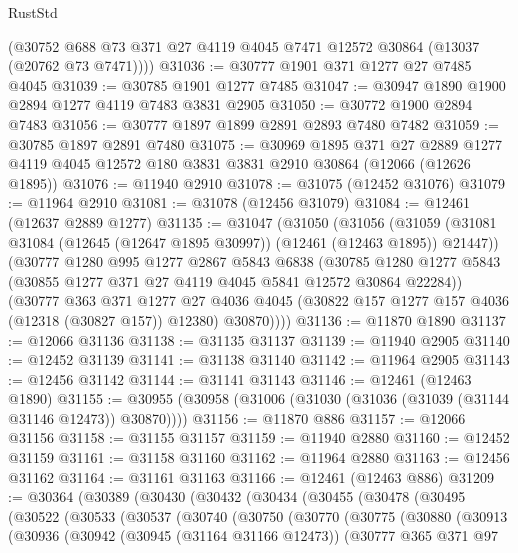 \begin{lexlean}{RustStd}
\begin{coremodule}
      (@30752 @688 @73 @371 @27 @4119 @4045 @7471 @12572 @30864 (@13037 (@20762 @73 @7471))))
@31036 := @30777 @1901 @371 @1277 @27 @7485 @4045
@31039 := @30785 @1901 @1277 @7485
@31047 := @30947 @1890 @1900 @2894 @1277 @4119 @7483 @3831 @2905
@31050 := @30772 @1900 @2894 @7483
@31056 := @30777 @1897 @1899 @2891 @2893 @7480 @7482
@31059 := @30785 @1897 @2891 @7480
@31075 := @30969
    @1895
    @371
    @27
    @2889
    @1277
    @4119
    @4045
    @12572
    @180
    @3831
    @3831
    @2910
    @30864
    (@12066 (@12626 @1895))
@31076 := @11940 @2910
@31078 := @31075 (@12452 @31076)
@31079 := @11964 @2910
@31081 := @31078 (@12456 @31079)
@31084 := @12461 (@12637 @2889 @1277)
@31135 := @31047
    (@31050
      (@31056
        (@31059 (@31081 @31084 (@12645 (@12647 @1895 @30997)) (@12461 (@12463 @1895)) @21447))
        (@30777
          @1280
          @995
          @1277
          @2867
          @5843
          @6838
          (@30785 @1280 @1277 @5843 (@30855 @1277 @371 @27 @4119 @4045 @5841 @12572 @30864 @22284))
          (@30777
            @363
            @371
            @1277
            @27
            @4036
            @4045
            (@30822 @157 @1277 @157 @4036 (@12318 (@30827 @157)) @12380)
            @30870))))
@31136 := @11870 @1890
@31137 := @12066 @31136
@31138 := @31135 @31137
@31139 := @11940 @2905
@31140 := @12452 @31139
@31141 := @31138 @31140
@31142 := @11964 @2905
@31143 := @12456 @31142
@31144 := @31141 @31143
@31146 := @12461 (@12463 @1890)
@31155 := @30955 (@30958 (@31006 (@31030 (@31036 (@31039 (@31144 @31146 @12473)) @30870))))
@31156 := @11870 @886
@31157 := @12066 @31156
@31158 := @31155 @31157
@31159 := @11940 @2880
@31160 := @12452 @31159
@31161 := @31158 @31160
@31162 := @11964 @2880
@31163 := @12456 @31162
@31164 := @31161 @31163
@31166 := @12461 (@12463 @886)
@31209 := @30364
    (@30389
      (@30430
        (@30432
          (@30434
            (@30455
              (@30478
                (@30495
                  (@30522
                    (@30533
                      (@30537
                        (@30740
                          (@30750
                            (@30770
                              (@30775
                                (@30880
                                  (@30913
                                    (@30936
                                      (@30942
                                        (@30945 (@31164 @31166 @12473))
                                        (@30777
                                          @365
                                          @371
                                          @97

\end{coremodule}
\end{lexlean}
